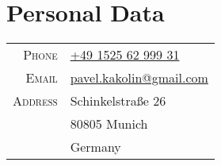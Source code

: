 \documentclass[a4paper]{article}
\begin{document}
    \pagestyle{empty}


    \section{Personal Data}
    \begin{tabular}{rl}
        \textsc{Phone}   & \href{tel:+49-1525-62-999-31}{+49 1525 62 999 31}              \\
        \textsc{Email}   & \href{mailto:pavel.kakolin@gmail.com}{pavel.kakolin@gmail.com} \\
        \textsc{Address} & Schinkelstra{\ss}e 26                                          \\
                         & 80805 Munich                                                   \\
                         & Germany                                                        \\
    \end{tabular}
\end{document}
